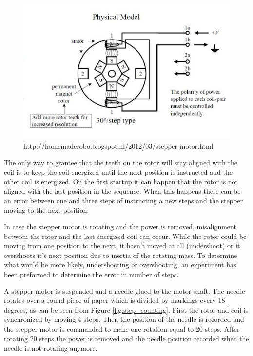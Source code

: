 \begin{figure}
	\centering
	\includegraphics[width=\textwidth]{pics/bipolar_stepper.png}
	\caption{http://homemaderobo.blogspot.nl/2012/03/stepper-motor.html}
	\label{fig:bipolarstepper}
\end{figure}

The only way to grantee that the teeth on the rotor will stay aligned with the coil is to keep the coil energized until the next position is instructed and the other coil is energized. 
On the first startup it can happen that the rotor is not aligned with the last position in the sequence.
When this happens there can be an error between one and three steps of instructing a new steps and the stepper moving to the next position.

In case the stepper motor is rotating and the power is removed, misalignment between the rotor and the last energized coil can occur.
While the rotor could be moving from one position to the next, it hasn't moved at all (undershoot) or it overshoots it's next position due to inertia of the rotating mass. 
To determine what would be more likely, undershooting or overshooting, an experiment has been preformed to determine the error in number of steps.

A stepper motor is suspended and a needle glued to the motor shaft.
The needle rotates over a round piece of paper which is divided by markings every 18 degrees, as can be seen from Figure \ref{fig:step_counting}.
First the rotor and coil is synchronized by moving 4 steps.
Then the position of the needle is recorded and the stepper motor is commanded to make one rotation equal to 20 steps.
After rotating 20 steps the power is removed and the needle position recorded when the needle is not rotating anymore.

